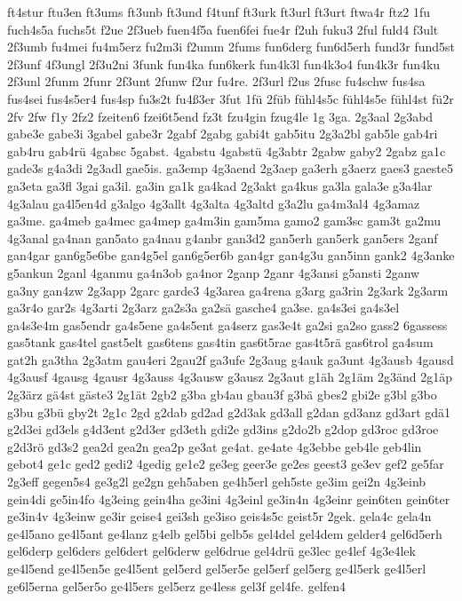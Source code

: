 {ft4stur
ftu3en
ft3ums
ft3unb
ft3und
f4tunf
ft3urk
ft3url
ft3urt
ftwa4r
ftz2
1fu
fuch4s5a
fuchs5t
f2ue
2f3ueb
fuen4f5a
fuen6fei
fue4r
f2uh
fuku3
2ful
fuld4
f3ult
2f3umb
fu4mei
fu4m5erz
fu2m3i
f2umm
2fums
fun6derg
fun6d5erh
fund3r
fund5st
2f3unf
4f3ungl
2f3u2ni
3funk
fun4ka
fun6kerk
fun4k3l
fun4k3o4
fun4k3r
fun4ku
2f3unl
2funm
2funr
2f3unt
2funw
f2ur
fu4re.
2f3url
f2us
2fusc
fu4schw
fus4sa
fus4sei
fus4s5er4
fus4sp
fu3s2t
fu4ß3er
3fut
1fü
2füb
fühl4s5c
fühl4s5e
fühl4st
fü2r
2fv
2fw
f1y
2fz2
fzeiten6
fzei6t5end
fz3t
fzu4gin
fzug4le
1g
3ga.
2g3aal
2g3abd
gabe3e
gabe3i
3gabel
gabe3r
2gabf
2gabg
gabi4t
gab5itu
2g3a2bl
gab5le
gab4ri
gab4ru
gab4rü
4gabsc
5gabst.
4gabstu
4gabstü
4g3abtr
2gabw
gaby2
2gabz
ga1c
gade3s
g4a3di
2g3adl
gae5is.
ga3emp
4g3aend
2g3aep
ga3erh
g3aerz
gaes3
gaeste5
ga3eta
ga3fl
3gai
ga3il.
ga3in
ga1k
ga4kad
2g3akt
ga4kus
ga3la
gala3e
g3a4lar
4g3alau
ga4l5en4d
g3algo
4g3allt
4g3alta
4g3altd
g3a2lu
ga4m3al4
4g3amaz
ga3me.
ga4meb
ga4mec
ga4mep
ga4m3in
gam5ma
gamo2
gam3sc
gam3t
ga2mu
4g3anal
ga4nan
gan5ato
ga4nau
g4anbr
gan3d2
gan5erh
gan5erk
gan5ers
2ganf
gan4gar
gan6g5e6be
gan4g5el
gan6g5er6b
gan4gr
gan4g3u
gan5inn
gank2
4g3anke
g5ankun
2ganl
4ganmu
ga4n3ob
ga4nor
2ganp
2ganr
4g3ansi
g5ansti
2ganw
ga3ny
gan4zw
2g3app
2garc
garde3
4g3area
ga4rena
g3arg
ga3rin
2g3ark
2g3arm
ga3r4o
gar2s
4g3arti
2g3arz
ga2s3a
ga2sä
gasche4
ga3se.
ga4s3ei
ga4s3el
ga4s3e4m
gas5endr
ga4s5ene
ga4s5ent
ga4serz
gas3e4t
ga2si
ga2so
gass2
6gassess
gas5tank
gas4tel
gast5elt
gas6tens
gas4tin
gas6t5rae
gas4t5rä
gas6trol
ga4sum
gat2h
ga3tha
2g3atm
gau4eri
2gau2f
ga3ufe
2g3aug
g4auk
ga3unt
4g3ausb
4gausd
4g3ausf
4gausg
4gausr
4g3auss
4g3ausw
g3ausz
2g3aut
g1äh
2g1äm
2g3änd
2g1äp
2g3ärz
gä4st
gäste3
2g1ät
2gb2
g3ba
gb4au
gbau3f
g3bä
gbes2
gbi2e
g3bl
g3bo
g3bu
g3bü
gby2t
2g1c
2gd
g2dab
gd2ad
g2d3ak
gd3all
g2dan
gd3anz
gd3art
gdä1
g2d3ei
gd3els
g4d3ent
g2d3er
gd3eth
gdi2e
gd3ins
g2do2b
g2dop
gd3roc
gd3roe
g2d3rö
gd3s2
gea2d
gea2n
gea2p
ge3at
ge4at.
ge4ate
4g3ebbe
geb4le
geb4lin
gebot4
ge1c
ged2
gedi2
4gedig
ge1e2
ge3eg
geer3e
ge2es
geest3
ge3ev
gef2
ge5far
2g3eff
gegen5s4
ge3g2l
ge2gn
geh5aben
ge4h5erl
geh5ste
ge3im
gei2n
4g3einb
gein4di
ge5in4fo
4g3eing
gein4ha
ge3ini
4g3einl
ge3in4n
4g3einr
gein6ten
gein6ter
ge3in4v
4g3einw
ge3ir
geise4
gei3sh
ge3iso
geis4s5c
geist5r
2gek.
gela4c
gela4n
ge4l5ano
ge4l5ant
ge4lanz
g4elb
gel5bi
gelb5s
gel4del
gel4dem
gelder4
gel6d5erh
gel6derp
gel6ders
gel6dert
gel6derw
gel6drue
gel4drü
ge3lec
ge4lef
4g3e4lek
ge4l5end
ge4l5en5e
ge4l5ent
gel5erd
gel5er5e
gel5erf
gel5erg
ge4l5erk
ge4l5erl
ge6l5erna
gel5er5o
ge4l5ers
gel5erz
ge4less
gel3f
gel4fe.
gelfen4
}
